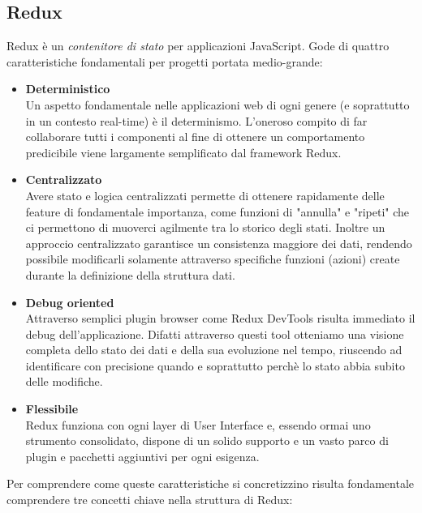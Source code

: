 \subsection{Redux}
Redux \cite{caratteristiche_redux} è un \emph{contenitore di stato} per applicazioni JavaScript.\newline
Gode di quattro caratteristiche fondamentali per progetti portata medio-grande:
\begin{itemize}
  \item \textbf{Deterministico}\\
  Un aspetto fondamentale nelle applicazioni web di ogni genere (e soprattutto in un contesto real-time) è il determinismo.\newline
  L'oneroso compito di far collaborare tutti i componenti al fine di ottenere un comportamento predicibile viene largamente semplificato dal framework Redux.
  \item \textbf{Centralizzato}\\
  Avere stato e logica centralizzati permette di ottenere rapidamente delle feature di fondamentale importanza, come funzioni di "annulla" e "ripeti" che ci permettono di muoverci agilmente tra lo storico degli stati.\newline
  Inoltre un approccio centralizzato garantisce un consistenza maggiore dei dati, rendendo possibile modificarli solamente attraverso specifiche funzioni (azioni) create durante la definizione della struttura dati.
  \item \textbf{Debug oriented}\\
  Attraverso semplici plugin browser come Redux DevTools risulta immediato il debug dell'applicazione.\newline
  Difatti attraverso questi tool otteniamo una visione completa dello stato dei dati e della sua evoluzione nel tempo, riuscendo ad identificare con precisione quando e soprattutto perchè lo stato abbia subito delle modifiche.
  \item \textbf{Flessibile}\\
  Redux funziona con ogni layer di User Interface e, essendo ormai uno strumento consolidato, dispone di un solido supporto e un vasto parco di plugin e pacchetti aggiuntivi per ogni esigenza.
\end{itemize}
Per comprendere come queste caratteristiche si concretizzino risulta fondamentale comprendere tre concetti chiave nella struttura di Redux:
